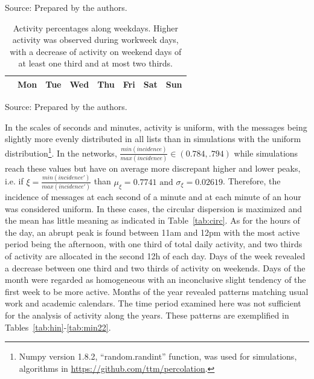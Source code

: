 \begin{table}
\caption{Activity percentages along the hours of the day. Nearly identical distributions were observed on other social systems as shown in Section~\ref*{si:hours} of the Supporting Information document.
Highest activity was observed between noon and 6pm (with 1/3 of total day activity), followed by the time period between 6pm and midnight.
Around 2/3 of the activity takes place from noon to midnight
but the activity peak occurs between 11 a.m. and 12 p.m.
This table shows results for the activity in CPP.}
\footnotesize

\label{tab:hin}
\begin{flushleft}
		Source: Prepared by the authors.\
\end{flushleft}
\end{table}


\begin{table}
\caption{Activity percentages along weekdays.
Higher activity was observed during workweek days, with a decrease of activity on weekend days of at least one third and at most two thirds.}
\begin{center}
\begin{tabular}{ | l ||  c | c | c | c | c |   c | c |}
\hline
& Mon & Tue & Wed & Thu & Fri & Sat & Sun  \\ \hline

\end{tabular}
\end{center}
\label{tab:win}
\begin{flushleft}
		Source: Prepared by the authors.\
\end{flushleft}
\end{table}

In the scales of seconds and minutes, activity is uniform,
with the messages being slightly more evenly distributed in all lists than in simulations with the uniform distribution\footnote{Numpy version 1.8.2, ``random.randint'' function, was used for simulations, algorithms in \url{https://github.com/ttm/percolation}.}.
In the networks, $\frac{min(incidence)}{max(incidence)} \in (0.784,.794)$ while simulations reach these values but have on average more discrepant higher and lower peaks, i.e. if $\xi=\frac{min(incidence')}{max(incidence')}$ than $\mu_\xi=0.7741 \text{ and } \sigma_\xi=0.02619$.
Therefore, the incidence of messages at each second of a minute and at each minute of an hour was considered uniform.
In these cases, the circular dispersion is maximized and the mean has little meaning as indicated in Table~\ref{tab:circ}.
As for the hours of the day, an abrupt peak is found between 11am and 12pm with the most active period being the afternoon, with one third of total daily activity, and two thirds of activity are allocated in the second 12h of each day. Days of the week revealed a decrease between one third and two thirds of activity on weekends.
Days of the month were regarded as homogeneous with an inconclusive slight tendency of the first week to be more active.
Months of the year revealed patterns matching usual work and academic calendars. The time period examined here was not sufficient for the analysis of activity along the years. These patterns are exemplified in Tables~\ref{tab:hin}-\ref{tab:min22}.



